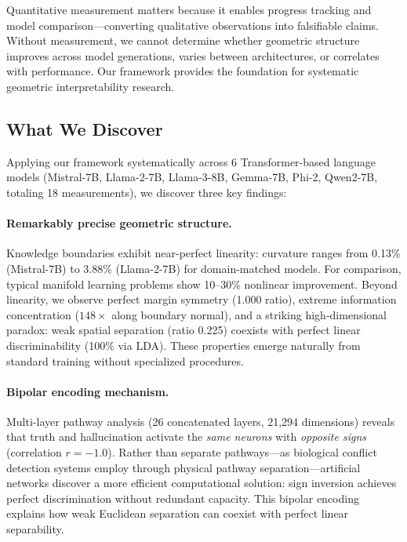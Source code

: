 \documentclass[11pt]{article}
\begin{document}
Quantitative measurement matters because it enables progress tracking and model comparison---converting qualitative observations into falsifiable claims. Without measurement, we cannot determine whether geometric structure improves across model generations, varies between architectures, or correlates with performance. Our framework provides the foundation for systematic geometric interpretability research.

\subsection{What We Discover}
\label{sec:intro-discoveries}

Applying our framework systematically across 6 Transformer-based language models (Mistral-7B, Llama-2-7B, Llama-3-8B, Gemma-7B, Phi-2, Qwen2-7B, totaling 18 measurements), we discover three key findings:

\paragraph{Remarkably precise geometric structure.} Knowledge boundaries exhibit near-perfect linearity: curvature ranges from 0.13\% (Mistral-7B) to 3.88\% (Llama-2-7B) for domain-matched models. For comparison, typical manifold learning problems show 10--30\% nonlinear improvement. Beyond linearity, we observe perfect margin symmetry (1.000 ratio), extreme information concentration ($148\times$ along boundary normal), and a striking high-dimensional paradox: weak spatial separation (ratio 0.225) coexists with perfect linear discriminability (100\% via LDA). These properties emerge naturally from standard training without specialized procedures.

\paragraph{Bipolar encoding mechanism.} Multi-layer pathway analysis (26 concatenated layers, 21,294 dimensions) reveals that truth and hallucination activate the \textit{same neurons} with \textit{opposite signs} (correlation $r = -1.0$). Rather than separate pathways---as biological conflict detection systems employ through physical pathway separation---artificial networks discover a more efficient computational solution: sign inversion achieves perfect discrimination without redundant capacity. This bipolar encoding explains how weak Euclidean separation can coexist with perfect linear separability.
\end{document}
